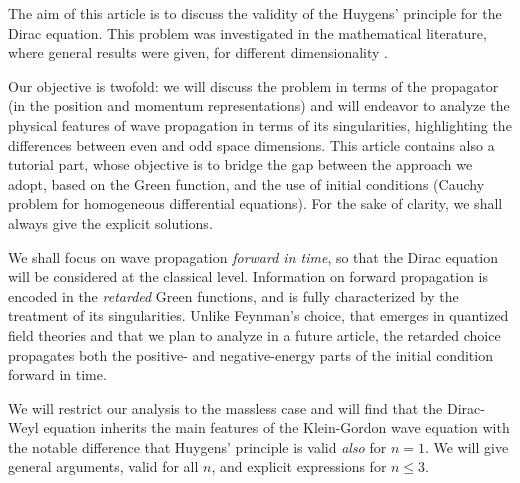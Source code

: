 The aim of this article is to discuss the validity of the Huygens' principle for the Dirac equation. This problem was investigated in the mathematical literature, where general results were given, for different dimensionality \cite{Gunther,chalub,chalub2}. {Our objective is twofold: we will discuss the problem in terms of the propagator (in the position and momentum representations) and will endeavor to analyze the physical features of wave propagation in terms of its singularities, highlighting the differences between even and odd space dimensions. This article contains also a tutorial part, whose objective is to bridge the gap between the approach we adopt, based on the Green function, and the use of initial conditions (Cauchy problem for homogeneous differential equations). For the sake of clarity, we shall always give the explicit solutions.

We shall focus on wave propagation \textit{forward in time}, so that the Dirac equation will be considered at the classical level. Information on forward propagation is encoded in the \emph{retarded} Green functions, and is fully characterized by the treatment of its singularities. Unlike Feynman's choice, that emerges in quantized field theories and that we plan to analyze in a future article, the retarded choice propagates both the positive- and negative-energy parts of the initial condition forward in time.} We will restrict our analysis to the massless case and will find that the Dirac-Weyl equation inherits the main features of the Klein-Gordon wave equation with the notable difference that Huygens' principle is valid \emph{also} for $n=1$. We will give general arguments, valid for all $n$, and explicit expressions for $n\leq 3$.


